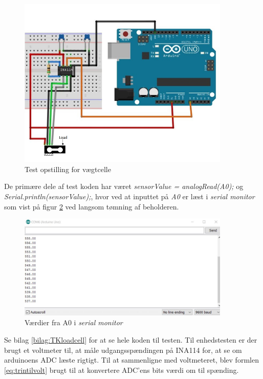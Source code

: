   \begin{figure}[H]
	\centering
	\includegraphics[width=0.9\textwidth]{billeder/Hardware/diagrammer/Drawing1.jpg}
	\caption{Test opstilling for vægtcelle}
	\label{fig:loadcelltest}
\end{figure}
De primære dele af test koden har været  \textit{sensorValue = analogRead(A0);} og \textit{Serial.println(sensorValue);}, hvor ved at inputtet på \textit{A0} er læst i \textit{serial monitor} som vist på figur \ref{fig:loadcell_test} ved langsom tømning af beholderen.

\begin{figure}[H]
	\centering
	\includegraphics[width=0.9\textwidth]{billeder/Hardware/diagrammer/loadcellunittestbits.JPG}
	\caption{Værdier fra A0 i \textit{serial monitor}}
	\label{fig:loadcell_test}
\end{figure}

 Se bilag \ref{bilag:TKloadcell} for at se hele koden til testen. Til enhedstesten er der brugt et voltmeter til, at måle udgangsspændingen på INA114 for, at se om arduinoens ADC læste rigtigt. Til at sammenligne med voltmeteret, blev formlen \ref{eq:trintilvolt} brugt til at konvertere ADC'ens bits værdi om til spænding.
 
